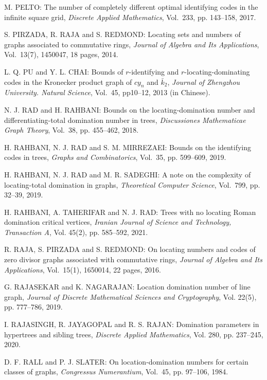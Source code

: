 \begin{thebibliography}{999}
M. PELTO: The number of completely different optimal identifying codes in the infinite square grid, {\it Discrete Applied Mathematics}, Vol.~233, pp. 143--158,  2017.

S. PIRZADA, R. RAJA and S. REDMOND: Locating sets and numbers of graphs associated to commutative rings, {\it Journal of Algebra and Its Applications}, Vol.~13(7), 1450047, 18 pages, 2014.

L. Q. PU and Y. L. CHAI: Bounds of $r$-identifying and $r$-locating-dominating codes in the Kronecker product graph of $cy_n$ and $\bar{k}_2$, {\it Journal of Zhengzhou University. Natural Science}, Vol.~45, pp10--12, 2013 (in Chinese).

N. J. RAD and H. RAHBANI: Bounds on the locating-domination number and differentiating-total domination number in trees, {\it Discussiones Mathematicae Graph Theory}, Vol.~38, pp. 455--462, 2018.

H. RAHBANI, N. J. RAD and S. M. MIRREZAEI: Bounds on the identifying codes in trees, {\it Graphs and Combinatorics}, Vol.~35, pp. 599--609, 2019.

H. RAHBANI, N. J. RAD and M. R. SADEGHI: A note on the complexity of locating-total domination in graphs, {\it Theoretical Computer Science}, Vol.~799, pp. 32--39, 2019.

H. RAHBANI, A. TAHERIFAR and N. J. RAD: Trees with no locating Roman domination critical vertices, {\it Iranian Journal of Science and Technology, Transaction A}, Vol. 45(2), pp. 585--592, 2021.

R. RAJA, S. PIRZADA and S. REDMOND: On locating numbers and codes of zero divisor graphs associated with commutative rings, {\it Journal of Algebra and Its Applications}, Vol.~15(1), 1650014, 22 pages, 2016.

G. RAJASEKAR and K. NAGARAJAN: Location domination number of line graph, {\it Journal of Discrete Mathematical Sciences and Cryptography}, Vol. 22(5), pp. 777--786, 2019.

I. RAJASINGH, R. JAYAGOPAL and R. S. RAJAN: Domination parameters in hypertrees and sibling trees, {\it Discrete Applied Mathematics}, Vol. 280, pp. 237--245, 2020.

D. F. RALL and P. J. SLATER: On location-domination numbers for certain classes of graphs, {\it Congressus Numerantium}, Vol.~45, pp. 97--106, 1984.


\end{thebibliography}

